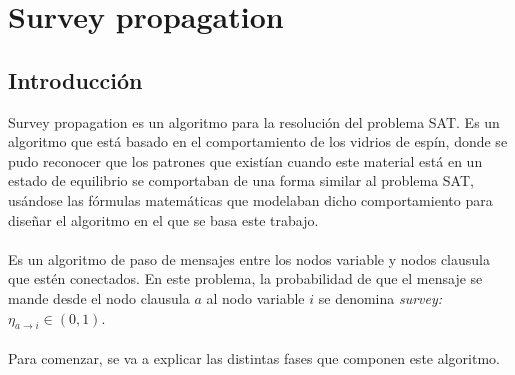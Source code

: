 \section{Survey propagation}
\subsection{Introducción}
Survey propagation es un algoritmo para la resolución del problema SAT.
Es un algoritmo que está basado en el comportamiento de los vidrios de espín, donde se pudo reconocer que los patrones que existían cuando este material está en un estado de equilibrio se comportaban de una forma similar al problema SAT, usándose las fórmulas matemáticas que modelaban dicho comportamiento para diseñar el algoritmo en el que se basa este trabajo.\\\\
Es un algoritmo de paso de mensajes entre los nodos variable y nodos clausula que estén conectados. En este problema, la probabilidad de que el mensaje se mande desde el nodo clausula $a$ al nodo variable $i$ se denomina \textit{survey:} $\eta_{a\rightarrow i} \in (0, 1) $.\\\\
Para comenzar, se va a explicar las distintas fases que componen este algoritmo. 
